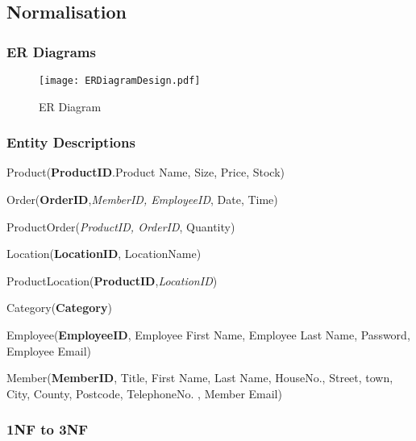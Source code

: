 \begin{python}
\subsection{Normalisation}

\subsubsection{ER Diagrams}

\begin{figure}[H]
\caption{ER Diagram} \label{fig:ER Diagram}
\hfill\texttt{[image: ERDiagramDesign.pdf]}\hspace*{\fill}
\end{figure}

\subsubsection{Entity Descriptions}

Product(\textbf{ProductID}.Product Name, Size, Price, Stock)

Order(\textbf{OrderID},\textit{MemberID, EmployeeID}, Date, Time)

ProductOrder(\textit{ProductID, OrderID}, Quantity)

Location(\textbf{LocationID}, LocationName)

ProductLocation(\textbf{ProductID},\textit{LocationID})

Category(\textbf{Category})

Employee(\textbf{EmployeeID}, Employee First Name, Employee Last Name, Password, Employee Email)

Member(\textbf{MemberID}, Title, First Name, Last Name, HouseNo., Street, town, City, County, Postcode, TelephoneNo. , Member Email)

\pagebreak

\subsubsection{1NF to 3NF}




\end{python}
